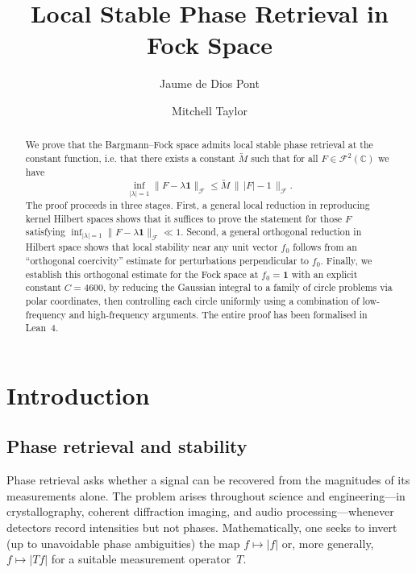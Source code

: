\documentclass[11pt]{amsart}
\title{Local Stable Phase Retrieval in Fock Space}
\author{Jaume de Dios Pont}
\author{Mitchell Taylor}
\theoremstyle{definition}
\theoremstyle{remark}
\begin{document}
\begin{abstract}
We prove that the Bargmann--Fock space admits local stable phase retrieval at
the constant function, i.e. that there exists a constant \(\widetilde M\)
such that for all \(F\in \mathcal{F}^2(\mathbb{C})\) we have
\[
\inf_{\lvert \lambda \rvert=1}\lVert F-\lambda\mathbf 1 \rVert_{\mathcal{F}}
\le
\widetilde M\,\bigl\|\,\lvert F \rvert-1\,\bigr\|_{\mathcal{F}}.
\]
The proof proceeds in three stages. First, a general local reduction in
reproducing kernel Hilbert spaces shows that it suffices to prove the
statement for those \(F\) satisfying
\(\inf_{\lvert \lambda \rvert=1}\lVert F-\lambda\mathbf 1 \rVert_{\mathcal{F}}\ll1\). Second, a
general orthogonal reduction in Hilbert space shows that local stability near
any unit vector \(f_0\) follows from an ``orthogonal coercivity'' estimate for
perturbations perpendicular to \(f_0\). Finally, we establish this orthogonal
estimate for the Fock space at \(f_0=\mathbf 1\) with an explicit constant
\(C=4600\), by reducing the Gaussian integral to a family of circle problems
via polar coordinates, then controlling each circle uniformly using a
combination of low-frequency and high-frequency arguments. The entire proof
has been formalised in Lean~4.
\end{abstract}
\maketitle

\section{Introduction}\label{sec:intro}

\subsection{Phase retrieval and stability}

Phase retrieval asks whether a signal can be recovered from the magnitudes of
its measurements alone.  The problem arises throughout science and
engineering---in crystallography, coherent diffraction imaging, and audio
processing---whenever detectors record intensities but not phases.
Mathematically, one seeks to invert (up to unavoidable phase ambiguities) the
map $f \mapsto \lvert f \rvert$ or, more generally, $f \mapsto \lvert Tf \rvert$ for a
suitable measurement operator~$T$.
\end{document}
